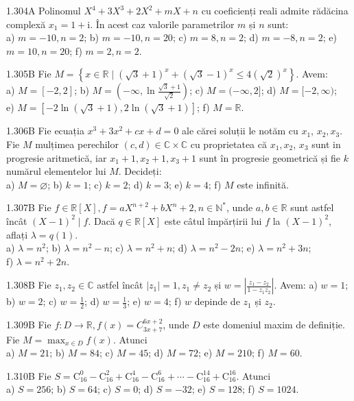 \documentclass[11pt]{article}
\begin{document}
1.304A Polinomul $X^{4}+3X^{3}+2X^{2}+mX+n$ cu coeficienți reali admite rădăcina complexă $x_{1}=1+\mathrm{i}$. În acest caz valorile parametrilor $m$ și $n$ sunt:\\ a) $m=-10, n=2$; b) $m=-10, n=20$; c) $m=8, n=2$; d) $m=-8, n=2$; e) $m=10, n=20$; f) $m=2, n=2$.

1.305B Fie $M=\left\{x \in \mathbb{R} \mid(\sqrt{3}+1)^{x}+(\sqrt{3}-1)^{x} \leq 4(\sqrt{2})^{x}\right\}$. Avem:\\ a) $M=[-2,2]$; b) $M=\left(-\infty, \ln \frac{\sqrt{3}+1}{\sqrt{2}}\right)$; c) $M=(-\infty, 2]$; d) $M=[-2, \infty)$;\\ e) $M=[-2 \ln (\sqrt{3}+1), 2 \ln (\sqrt{3}+1)]$; f) $M=\mathbb{R}$.

1.306B Fie ecuația $x^{3}+3 x^{2}+c x+d=0$ ale cărei soluții le notăm cu $x_{1}$, $x_{2}, x_{3}$. Fie $M$ mulțimea perechilor $(c, d) \in \mathbb{C} \times \mathbb{C}$ cu proprietatea că $x_{1}, x_{2}$, $x_{3}$ sunt in progresie aritmetică, iar $x_{1}+1, x_{2}+1, x_{3}+1$ sunt în progresie geometrică și fie $k$ numărul elementelor lui $M$. Decideți:\\ a) $M=\varnothing$; b) $k=1$; c) $k=2$; d) $k=3$; e) $k=4$; f) $M$ este infinită.

1.307B Fie $f \in \mathbb{R}[X], f=a X^{n+2}+b X^{n}+2, n \in \mathbb{N}^{*}$, unde $a, b \in \mathbb{R}$ sunt astfel încât $(X-1)^{2} \mid f$. Dacă $q \in \mathbb{R}[X]$ este câtul împărțirii lui $f$ la $(X-1)^{2}$, aflați $\lambda=q(1)$.\\ a) $\lambda=n^{2}$; b) $\lambda=n^{2}-n$; c) $\lambda=n^{2}+n$; d) $\lambda=n^{2}-2 n$; e) $\lambda=n^{2}+3 n$;\\ f) $\lambda=n^{2}+2 n$.

1.308B Fie $z_{1}, z_{2} \in \mathbb{C}$ astfel încât $\left|z_{1}\right|=1, z_{1} \neq z_{2}$ și $w=\left|\frac{z_{1}-z_{2}}{1-z_{1} z_{2}}\right|$. Avem: a) $w=1$; b) $w=2$; c) $w=\frac{1}{2}$; d) $w=\frac{1}{3}$; e) $w=4$; f) $w$ depinde de $z_{1}$ și $z_{2}$.

1.309B Fie $f: D \rightarrow \mathbb{R}, f(x)=C_{3 x+7}^{6 x+2}$, unde $D$ este domeniul maxim de definiție. Fie $M=\max _{x \in D} f(x)$. Atunci\\ a) $M=21$; b) $M=84$; c) $M=45$; d) $M=72$; e) $M=210$; f) $M=60$.

1.310B Fie $S=\mathrm{C}_{16}^{0}-\mathrm{C}_{16}^{2}+\mathrm{C}_{16}^{4}-\mathrm{C}_{16}^{6}+\cdots-\mathrm{C}_{16}^{14}+\mathrm{C}_{16}^{16}$. Atunci\\ a) $S=256$; b) $S=64$; c) $S=0$; d) $S=-32$; e) $S=128$; f) $S=1024$.
\end{document}
